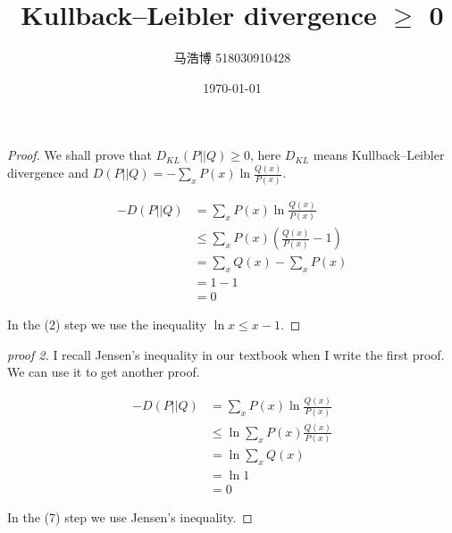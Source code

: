 \documentclass[12pt]{article}
\title{Kullback–Leibler divergence $\ge$ 0}
\author{马浩博 518030910428}
\date{\today}
\theoremstyle{mythm}
\begin{document}
\maketitle

\begin{proof}
	We shall prove that $D_{KL}(P||Q) \ge 0$, here $D_{KL}$ means Kullback–Leibler divergence and $D(P||Q)=-\sum_x P(x)\ln \frac{Q(x)}{P(x)}$. 
	
	\begin{align}
	-D(P||Q)&= \sum_x P(x)\ln \frac{Q(x)}{P(x)}\\
	&\stackrel{}{\leq} \sum_x P(x)\left(\frac{Q(x)}{P(x)}-1\right)\\
	&=\sum_x Q(x) - \sum_x P(x)\\
	&= 1 - 1\\
	&= 0
	\end{align}
	
	In the (2) step we use the inequality $\ln x \leq x-1$.
\end{proof}


\begin{proof}[proof 2]
	I recall Jensen's inequality in our textbook when I write the first proof. We can use it to get another proof.
	
	\begin{align}
	-D(P||Q)&= \sum_x P(x)\ln \frac{Q(x)}{P(x)}\\
	&\stackrel{}{\leq} \ln\sum_x P(x) \frac{Q(x)}{P(x)}\\
	&=\ln\sum_x Q(x)\\
	&=\ln 1\\
	&=0
	\end{align}
	
	In the (7) step we use Jensen's inequality.
\end{proof}
\end{document}
